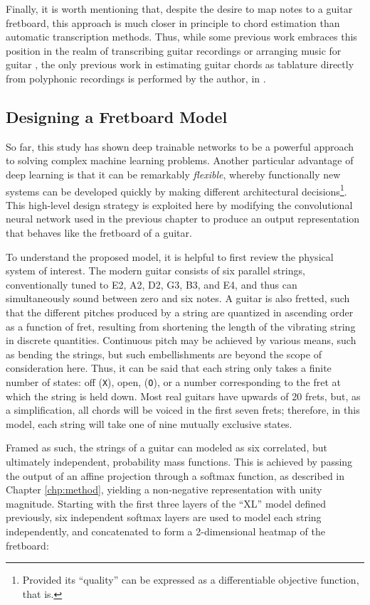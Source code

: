 Finally, it is worth mentioning that, despite the desire to map notes to a guitar fretboard, this approach is much closer in principle to chord estimation than automatic transcription methods.
Thus, while some previous work embraces this position in the realm of transcribing guitar recordings \cite{Barbancho2012} or arranging music for guitar \cite{Hori2013}, the only previous work in estimating guitar chords as tablature directly from polyphonic recordings is performed by the author, in \cite{Humphrey2014}.


\subsection{Designing a Fretboard Model}
\label{subsec:design}

So far, this study has shown deep trainable networks to be a powerful approach to solving complex machine learning problems.
Another particular advantage of deep learning is that it can be remarkably \emph{flexible}, whereby functionally new systems can be developed quickly by making different architectural decisions\footnote{
Provided its ``quality'' can be expressed as a differentiable objective function, that is.}.
This high-level design strategy is exploited here by modifying the convolutional neural network used in the previous chapter to produce an output representation that behaves like the fretboard of a guitar.

To understand the proposed model, it is helpful to first review the physical system of interest.
The modern guitar consists of six parallel strings, conventionally tuned to E2, A2, D2, G3, B3, and E4, and thus can simultaneously sound between zero and six notes.
A guitar is also fretted, such that the different pitches produced by a string are quantized in ascending order as a function of fret, resulting from shortening the length of the vibrating string in discrete quantities.
Continuous pitch may be achieved by various means, such as bending the strings, but such embellishments are beyond the scope of consideration here.
Thus, it can be said that each string only takes a finite number of states: off (\texttt{X}), open, (\texttt{O}), or a number corresponding to the fret at which the string is held down.
Most real guitars have upwards of 20 frets, but, as a simplification, all chords will be voiced in the first seven frets;
therefore, in this model, each string will take one of nine mutually exclusive states.

Framed as such, the strings of a guitar can modeled as six correlated, but ultimately independent, probability mass functions.
This is achieved by passing the output of an affine projection through a softmax function, as described in Chapter \ref{chp:method}, yielding a non-negative representation with unity magnitude.
Starting with the first three layers of the ``XL'' model defined previously, six independent softmax layers are used to model each string independently, and concatenated to form a 2-dimensional heatmap of the fretboard:

